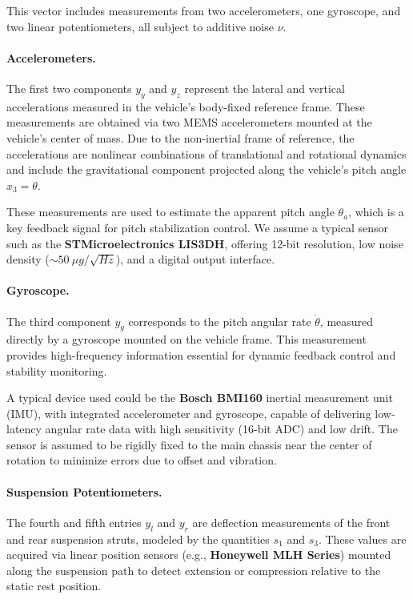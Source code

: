 \documentclass[]{report}
\begin{document}
This vector includes measurements from two accelerometers, one gyroscope, and two linear potentiometers, all subject to additive noise $\nu$.

\paragraph{Accelerometers.}
The first two components $y_y$ and $y_z$ represent the lateral and vertical accelerations measured in the vehicle’s body-fixed reference frame. These measurements are obtained via two MEMS accelerometers mounted at the vehicle's center of mass. Due to the non-inertial frame of reference, the accelerations are nonlinear combinations of translational and rotational dynamics and include the gravitational component projected along the vehicle's pitch angle $x_3 = \theta$.

These measurements are used to estimate the apparent pitch angle $\theta_a$, which is a key feedback signal for pitch stabilization control. We assume a typical sensor such as the \textbf{STMicroelectronics LIS3DH}, offering 12-bit resolution, low noise density ($\sim50~\mu g/\sqrt{Hz}$), and a digital output interface.

\paragraph{Gyroscope.}
The third component $y_g$ corresponds to the pitch angular rate $\dot{\theta}$, measured directly by a gyroscope mounted on the vehicle frame. This measurement provides high-frequency information essential for dynamic feedback control and stability monitoring.

A typical device used could be the \textbf{Bosch BMI160} inertial measurement unit (IMU), with integrated accelerometer and gyroscope, capable of delivering low-latency angular rate data with high sensitivity (16-bit ADC) and low drift. The sensor is assumed to be rigidly fixed to the main chassis near the center of rotation to minimize errors due to offset and vibration.

\paragraph{Suspension Potentiometers.}
The fourth and fifth entries $y_l$ and $y_r$ are deflection measurements of the front and rear suspension struts, modeled by the quantities $s_1$ and $s_3$. These values are acquired via linear position sensors (e.g., \textbf{Honeywell MLH Series}) mounted along the suspension path to detect extension or compression relative to the static rest position.
\end{document}
